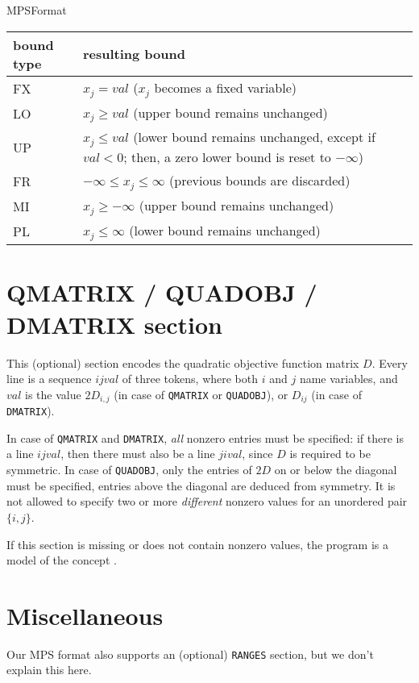 \begin{ccRefConcept}{MPSFormat}
\begin{tabular}{l|l}
bound type & resulting bound \\ \hline
FX & $x_j = val$ ($x_j$ becomes a fixed variable) \\
LO & $x_j \geq val$ (upper bound remains unchanged) \\
UP & $x_j \leq val$ (lower bound remains unchanged, except if $val<0$; then, 
a zero lower bound is reset to $-\infty$)\\
FR & $-\infty \leq x_j\leq\infty$ (previous bounds are discarded)\\
MI & $x_j\geq -\infty$ (upper bound remains unchanged)\\
PL & $x_j\leq \infty$ (lower bound remains unchanged)    
\end{tabular}

\section*{QMATRIX / QUADOBJ / DMATRIX section}
This (optional) section encodes the quadratic objective
function matrix $D$. Every line is a sequence $i j val$ of
three tokens, where both $i$ and $j$ name variables, and
$val$ is the value $2D_{i,j}$ (in case of \texttt{QMATRIX}
or \texttt{QUADOBJ}), or $D_{ij}$ (in case of \texttt{DMATRIX}).

In case of \texttt{QMATRIX} and \texttt{DMATRIX}, \emph{all} nonzero
entries must be specified: if there is a line $i j val$, then there
must also be a line $j i val$, since $D$ is required to be symmetric.
In case of \texttt{QUADOBJ}, only the entries of $2D$ on or below the 
diagonal must be specified, entries above the diagonal are deduced from 
symmetry. It is not allowed to specify two or more \emph{different} 
nonzero values for an unordered pair $\{i,j\}$.

If this section is missing or does not contain nonzero values, the
program is a model of the concept .

\section*{Miscellaneous}
Our MPS format also supports an (optional) \texttt{RANGES} section,
but we don't explain this here.


\end{ccRefConcept}
